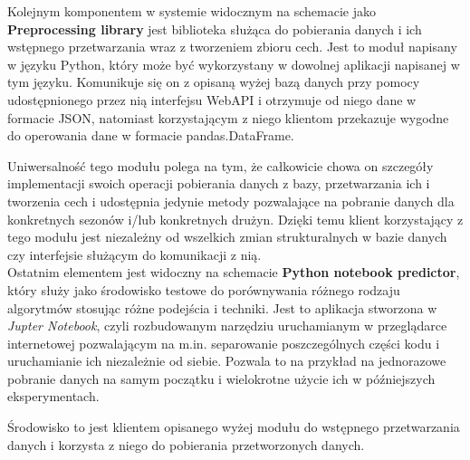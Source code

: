 Kolejnym komponentem w systemie widocznym na schemacie jako \textbf{Preprocessing library} jest biblioteka służąca do pobierania danych i ich wstępnego przetwarzania wraz z tworzeniem zbioru cech. Jest to moduł napisany w języku Python, który może być wykorzystany w dowolnej aplikacji napisanej w tym języku. Komunikuje się on z opisaną wyżej bazą danych przy pomocy udostępnionego przez nią interfejsu WebAPI i otrzymuje od niego dane w formacie JSON, natomiast korzystającym z niego klientom przekazuje wygodne do operowania dane w formacie pandas.DataFrame. 

Uniwersalność tego modułu polega na tym, że całkowicie chowa on szczegóły implementacji swoich operacji pobierania danych z bazy, przetwarzania ich i tworzenia cech i udostępnia jedynie metody pozwalające na pobranie danych dla konkretnych sezonów i/lub konkretnych drużyn. Dzięki temu klient korzystający z tego modułu jest niezależny od wszelkich zmian strukturalnych w bazie danych czy interfejsie służącym do komunikacji z nią.\\

Ostatnim elementem jest widoczny na schemacie \textbf{Python notebook predictor}, który służy jako środowisko testowe do porównywania różnego rodzaju algorytmów stosując różne podejścia i techniki. Jest to aplikacja stworzona w \textit{Jupter Notebook}, czyli rozbudowanym narzędziu uruchamianym w przeglądarce internetowej pozwalającym na m.in. separowanie poszczególnych części kodu i uruchamianie ich niezależnie od siebie. Pozwala to na przykład na jednorazowe pobranie danych na samym początku i wielokrotne użycie ich w późniejszych eksperymentach.

Środowisko to jest klientem opisanego wyżej modułu do wstępnego przetwarzania danych i korzysta z niego do pobierania przetworzonych danych. 

\newpage

